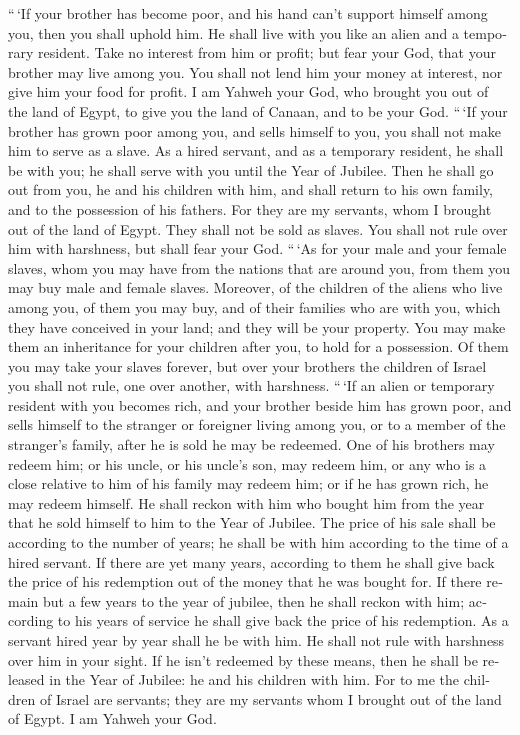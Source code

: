 \begin{paracol}{2}
\begin{otherlanguage}{english}
 ``\,`If your brother has become poor, and his hand can't
support himself among you, then you shall uphold him. He shall live with
you like an alien and a temporary resident.  Take no
interest from him or profit; but fear your God, that your brother may
live among you.  You shall not lend him your money at
interest, nor give him your food for profit.  I am Yahweh
your God, who brought you out of the land of Egypt, to give you the land
of Canaan, and to be your God.  ``\,`If your brother has
grown poor among you, and sells himself to you, you shall not make him
to serve as a slave.  As a hired servant, and as a
temporary resident, he shall be with you; he shall serve with you until
the Year of Jubilee.  Then he shall go out from you, he
and his children with him, and shall return to his own family, and to
the possession of his fathers.  For they are my servants,
whom I brought out of the land of Egypt. They shall not be sold as
slaves.  You shall not rule over him with harshness, but
shall fear your God.  ``\,`As for your male and your
female slaves, whom you may have from the nations that are around you,
from them you may buy male and female slaves.  Moreover,
of the children of the aliens who live among you, of them you may buy,
and of their families who are with you, which they have conceived in
your land; and they will be your property.  You may make
them an inheritance for your children after you, to hold for a
possession. Of them you may take your slaves forever, but over your
brothers the children of Israel you shall not rule, one over another,
with harshness.  ``\,`If an alien or temporary resident
with you becomes rich, and your brother beside him has grown poor, and
sells himself to the stranger or foreigner living among you, or to a
member of the stranger's family,  after he is sold he may
be redeemed. One of his brothers may redeem him;  or his
uncle, or his uncle's son, may redeem him, or any who is a close
relative to him of his family may redeem him; or if he has grown rich,
he may redeem himself.  He shall reckon with him who
bought him from the year that he sold himself to him to the Year of
Jubilee. The price of his sale shall be according to the number of
years; he shall be with him according to the time of a hired servant.
 If there are yet many years, according to them he shall
give back the price of his redemption out of the money that he was
bought for.  If there remain but a few years to the year
of jubilee, then he shall reckon with him; according to his years of
service he shall give back the price of his redemption. 
As a servant hired year by year shall he be with him. He shall not rule
with harshness over him in your sight.  If he isn't
redeemed by these means, then he shall be released in the Year of
Jubilee: he and his children with him.  For to me the
children of Israel are servants; they are my servants whom I brought out
of the land of Egypt. I am Yahweh your God.


\end{otherlanguage}
\end{paracol}
